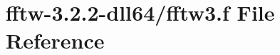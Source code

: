\hypertarget{fftw-3_82_82-dll64_2fftw3_8f}{\section{fftw-\/3.2.2-\/dll64/fftw3.f File Reference}
\label{fftw-3_82_82-dll64_2fftw3_8f}
}
